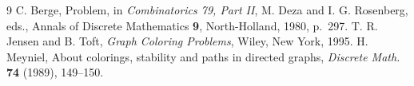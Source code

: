 \documentclass[11pt]{article}
\begin{document}
\begin{thebibliography}{9}
 C. Berge, Problem, in \emph{Combinatorics 79, Part II}, M. Deza and I. G. Rosenberg, eds., Annals of Discrete Mathematics \textbf{9}, North-Holland, 1980, p.~297.
 T. R. Jensen and B. Toft, \emph{Graph Coloring Problems}, Wiley, New York, 1995.
 H. Meyniel, About colorings, stability and paths in directed graphs, \emph{Discrete Math.} \textbf{74} (1989), 149--150.
\end{thebibliography}
\end{document}
